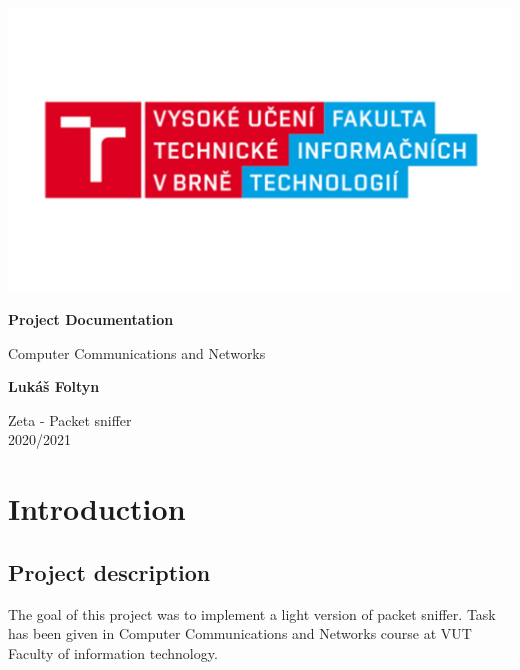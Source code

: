 \documentclass[a4paper,12pt]{article}
\begin{document}
\begin{titlepage}
    \begin{center}

        \includegraphics[width=\linewidth]{logo.jpg}
        \vspace*{0.5cm}
            
        \Huge
        \textbf{Project Documentation}
            
        \vspace{0.5cm}
        \LARGE
        Computer Communications and Networks
        
            
        \vspace{1.5cm}
            
        \textbf{Lukáš Foltyn}
            
        \vfill
        Zeta - Packet sniffer\\
        2020/2021
            
        \vspace{0.8cm}
 
    \end{center}
\end{titlepage}
\tableofcontents{}
\newpage
\frenchspacing

\section{Introduction}
    \subsection{Project description}
    The goal of this project was to implement a light version of packet sniffer. Task has been given in Computer Communications and Networks course at VUT Faculty of information technology. 
    
\end{document}
